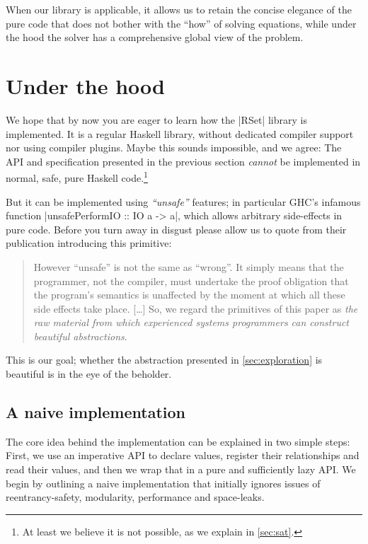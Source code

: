 \documentclass[manuscript,anonymous,screen,acmsmall]{acmart}
\begin{document}
When our library is applicable, it allows us to retain the concise elegance of the pure code that does not bother with the “how” of solving equations, while under the hood the solver has a comprehensive global view of the problem.


\section{Under the hood}\label{sec:impl}

We hope that by now you are eager to learn how the |RSet| library is implemented. It is a regular Haskell library, without dedicated compiler support nor using compiler plugins. Maybe this sounds impossible, and we agree: The API and specification presented in the previous section \emph{cannot} be implemented in normal, safe, pure Haskell code.\footnote{At least we believe it is not possible, as we explain in \cref{sec:sat}.}

But it can be implemented using \emph{“unsafe”} features; in particular GHC's infamous function |unsafePerformIO :: IO a -> a|, which allows arbitrary side-effects in pure code. Before you turn away in disgust please allow us to quote \citet{unsafePerformIO} from their publication introducing this primitive:
\begin{quote}
However “unsafe” is not the same as “wrong”. It simply means that the programmer, not the compiler, must undertake the proof obligation that the program's semantics is unaffected by the moment at which all these side effects take place. [\ldots]
So, we regard the primitives of this paper as \emph{the raw material from which experienced systems programmers can construct beautiful abstractions}.
\end{quote}
This is our goal; whether the abstraction presented in \cref{sec:exploration} is beautiful is in the eye of the beholder.

\subsection{A naive implementation}

The core idea behind the implementation can be explained in two simple steps: First, we use an imperative API to declare values, register their relationships and read their values, and then we wrap that in a pure and sufficiently lazy API. We begin by outlining a naive implementation that initially ignores issues of reentrancy-safety, modularity, performance and space-leaks.
\end{document}
